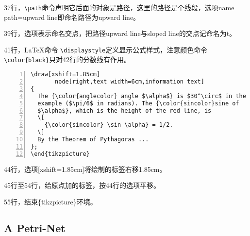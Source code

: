 \documentclass[UTF8]{ctexart}
\begin{document}
37行，\verb!\path!命令声明它后面的对象是路径，这里的路径是个线段，选项name path=upward line即命名路径为upward line。

39行，选项表示命名交点，把路径upward line与sloped line的交点记命名为t。

41行，\LaTeX 命令 \verb!\displaystyle!定义显示公式样式，注意颜色命令 \verb!\color{black}!只对42行的分数线有作用。


\begin{lstlisting}[name=example-1,numbers=left,    numberstyle=\footnotesize]
\draw[xshift=1.85cm]
       node[right,text width=6cm,information text]
{
  The {\color{anglecolor} angle $\alpha$} is $30^\circ$ in the
  example ($\pi/6$ in radians). The {\color{sincolor}sine of
  $\alpha$}, which is the height of the red line, is
  \[
    {\color{sincolor} \sin \alpha} = 1/2.
  \]
  By the Theorem of Pythagoras ...
};
\end{tikzpicture}
\end{lstlisting}

44行，选项[xshift=1.85cm]将绘制的标签右移1.85cm。

45行至54行，给原点加的标签，按44行的选项平移。

55行，结束\{tikzpicture\}环境。




\subsection{A Petri-Net}
\end{document}
